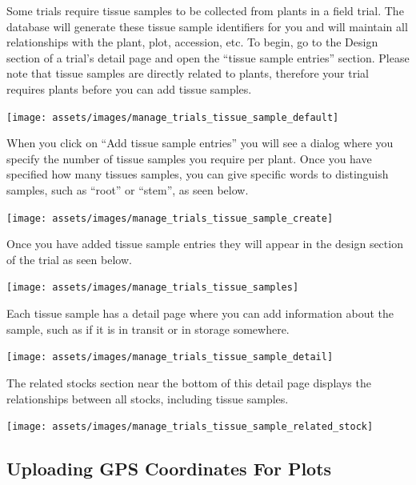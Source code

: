 \documentclass[
  12pt,
]{book}
\begin{document}
Some trials require tissue samples to be collected from plants in a field trial. The database will generate these tissue sample identifiers for you and will maintain all relationships with the plant, plot, accession, etc. To begin, go to the Design section of a trial's detail page and open the ``tissue sample entries'' section. Please note that tissue samples are directly related to plants, therefore your trial requires plants before you can add tissue samples.

\begin{center}\texttt{[image: assets/images/manage\_trials\_tissue\_sample\_default]} \end{center}

When you click on ``Add tissue sample entries'' you will see a dialog where you specify the number of tissue samples you require per plant. Once you have specified how many tissues samples, you can give specific words to distinguish samples, such as ``root'' or ``stem'', as seen below.

\begin{center}\texttt{[image: assets/images/manage\_trials\_tissue\_sample\_create]} \end{center}

Once you have added tissue sample entries they will appear in the design section of the trial as seen below.

\begin{center}\texttt{[image: assets/images/manage\_trials\_tissue\_samples]} \end{center}

Each tissue sample has a detail page where you can add information about the sample, such as if it is in transit or in storage somewhere.

\begin{center}\texttt{[image: assets/images/manage\_trials\_tissue\_sample\_detail]} \end{center}

The related stocks section near the bottom of this detail page displays the relationships between all stocks, including tissue samples.

\begin{center}\texttt{[image: assets/images/manage\_trials\_tissue\_sample\_related\_stock]} \end{center}

\hypertarget{uploading-gps-coordinates-for-plots}{%
\subsection{Uploading GPS Coordinates For Plots}\label{uploading-gps-coordinates-for-plots}}
\end{document}
